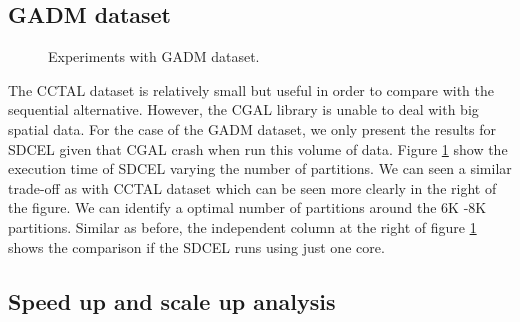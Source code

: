 \subsection{GADM dataset}

\begin{figure}[!ht]
    \centering
    \hfill
    \caption{Experiments with GADM dataset. \label{fig:gadm}} 
\end{figure}

The CCTAL dataset is relatively small but useful in order to compare with the sequential alternative.  However, the CGAL library is unable to deal with big spatial data.  For the case of the GADM dataset, we only present the results for SDCEL given that CGAL crash when run this volume of data.  Figure \ref{fig:gadm} show the execution time of SDCEL varying the number of partitions.  We can seen a similar trade-off as with CCTAL dataset which can be seen more clearly in the right of the figure.  We can identify a optimal number of partitions around the 6K -8K partitions.  Similar as before, the independent column at the right of figure \ref{fig:gadm} shows the comparison if the SDCEL runs using just one core.

\subsection{Speed up and scale up analysis}

